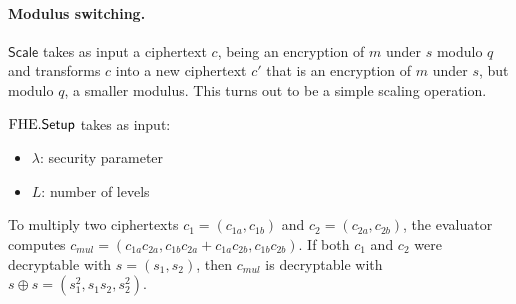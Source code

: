 \documentclass[11pt]{article}
\begin{document}



\paragraph{Modulus switching.}
$\mathsf{Scale}$ takes as input a ciphertext $c$, being an encryption of $m$ under $s$ modulo $q$ and transforms $c$ into a new ciphertext $c'$ that is an encryption of $m$ under $s$, but modulo $q$, a smaller modulus. This turns out to be a simple scaling operation. 



 $\mathrm{FHE}\mathsf{.}\mathsf{Setup}$ takes as input:
 \begin{itemize}
 \item $\lambda$: security parameter
 \item $L$: number of levels 
 \end{itemize}


To multiply two ciphertexts $c_1 = (c_{1a}, c_{1b})$ and $c_2 = (c_{2a}, c_{2b})$, the evaluator computes
$c_{mul} = (c_{1a} c_{2a}, c_{1b} c_{2a} + c_{1a} c_{2b}, c_{1b} c_{2b})$. If both $c_1$ and $c_2$ were decryptable with $s = (s_1, s_2)$, then
$c_{mul}$ is decryptable with $s \oplus s = (s_1^2, s_1s_2, s_2^2)$.

\end{document}
